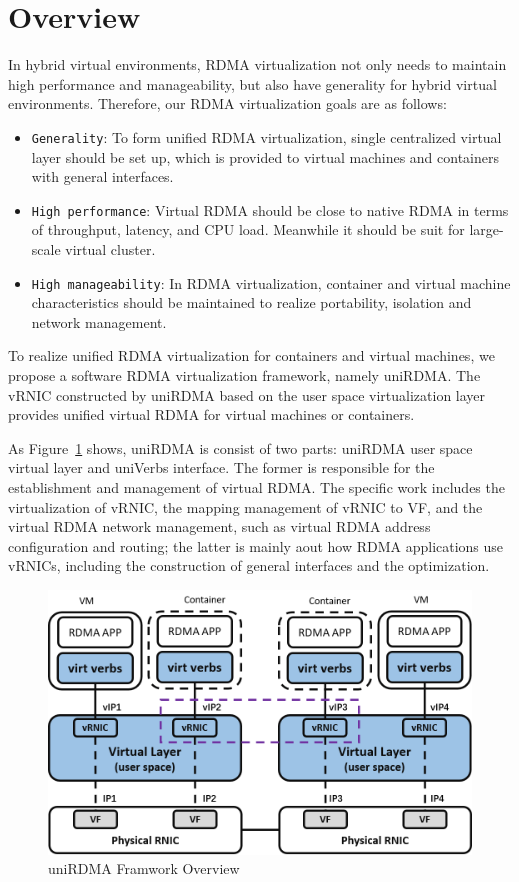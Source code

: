 \section{Overview}

In hybrid virtual environments, RDMA virtualization not only needs to maintain high performance and manageability, but also have generality for hybrid virtual environments. Therefore, our RDMA virtualization goals are as follows:

\begin{itemize}
\item {\verb|Generality|}: To form unified RDMA virtualization, single centralized virtual layer should be set up, which is provided to virtual machines and containers with general interfaces.
\item {\verb|High performance|}: Virtual RDMA should be close to native RDMA in terms of throughput, latency, and CPU load. Meanwhile it should be suit for large-scale virtual cluster.
\item {\verb|High manageability|}: In RDMA virtualization, container and virtual machine characteristics should be maintained to realize portability, isolation and network management.
\end{itemize}

To realize unified RDMA virtualization for containers and virtual machines,  we propose a software RDMA virtualization framework, namely uniRDMA. The vRNIC constructed by uniRDMA based on the user space virtualization layer provides unified virtual RDMA for virtual machines or containers.

As Figure~\ref{fig:framework-overview} shows, uniRDMA is consist of two parts: uniRDMA user space virtual layer and uniVerbs interface. The former is responsible for the establishment and management of virtual RDMA. The specific work includes the virtualization of vRNIC, the mapping management of vRNIC to VF, and the virtual RDMA network management, such as virtual RDMA address configuration and routing; the latter is mainly aout how RDMA applications use vRNICs, including the construction of general interfaces and the optimization.


\begin{figure}[!ht]
	\centering
	\includegraphics[width=1.0\linewidth]{images/framework-overview}
	\caption{uniRDMA Framwork Overview}
	\label{fig:framework-overview}
\end{figure}
